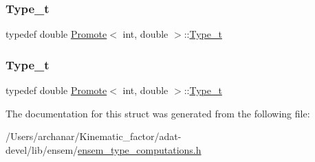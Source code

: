\subsubsection{\texorpdfstring{Type\_t}{Type\_t}\hspace{0.1cm}{\footnotesize\ttfamily [2/3]}}
{\footnotesize\ttfamily typedef double \mbox{\hyperlink{structPromote}{Promote}}$<$ int, double $>$\+::\mbox{\hyperlink{structPromote_3_01int_00_01double_01_4_afa774ce31e3f3add209e00c1c5b1c369}{Type\+\_\+t}}}

\mbox{\label{structPromote_3_01int_00_01double_01_4_afa774ce31e3f3add209e00c1c5b1c369}} 
\subsubsection{\texorpdfstring{Type\_t}{Type\_t}\hspace{0.1cm}{\footnotesize\ttfamily [3/3]}}
{\footnotesize\ttfamily typedef double \mbox{\hyperlink{structPromote}{Promote}}$<$ int, double $>$\+::\mbox{\hyperlink{structPromote_3_01int_00_01double_01_4_afa774ce31e3f3add209e00c1c5b1c369}{Type\+\_\+t}}}



The documentation for this struct was generated from the following file\+:\begin{DoxyCompactItemize}
\item 
/\+Users/archanar/\+Kinematic\+\_\+factor/adat-\/devel/lib/ensem/\mbox{\hyperlink{adat-devel_2lib_2ensem_2ensem__type__computations_8h}{ensem\+\_\+type\+\_\+computations.\+h}}\end{DoxyCompactItemize}
